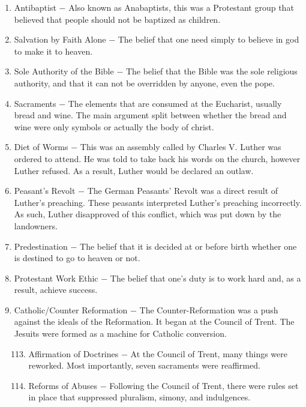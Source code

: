 \documentclass[12pt]{article}
\begin{document}
\begin{enumerate}
\item Antibaptist $-$ Also known as Anabaptists, this was a Protestant group that believed that people should not be baptized as children.

\item Salvation by Faith Alone $-$ The belief that one need simply to believe in god to make it to heaven.

\item Sole Authority of the Bible $-$ The belief that the Bible was the sole religious authority, and that it can not be overridden by anyone, even the pope.

\item Sacraments $-$ The elements that are consumed at the Eucharist, usually bread and wine. The main argument split between whether the bread and wine were only symbols or actually the body of christ.

\item Diet of Worms $-$ This was an assembly called by Charles V. Luther was ordered to attend. He was told to take back his words on the church, however Luther refused. As a result, Luther would be declared an outlaw.

\item Peasant's Revolt $-$ The German Peasants' Revolt was a direct result of Luther's preaching. These peasants interpreted Luther's preaching incorrectly. As such, Luther disapproved of this conflict, which was put down by the landowners.

\item Predestination $-$ The belief that it is decided at or before birth whether one is destined to go to heaven or not.

\item Protestant Work Ethic $-$ The belief that one's duty is to work hard and, as a result, achieve success.

\item Catholic/Counter Reformation $-$ The Counter-Reformation was a push against the ideals of the Reformation. It began at the Council of Trent. The Jesuits were formed as a machine for Catholic conversion.

\begin{enumerate}[label=\arabic{*}.]
\setcounter{enumii}{112}
\item Affirmation of Doctrines $-$ At the Council of Trent, many things were reworked. Most importantly, seven sacraments were reaffirmed.

\item Reforms of Abuses $-$ Following the Council of Trent, there were rules set in place that suppressed pluralism, simony, and indulgences.


\end{enumerate}
\end{enumerate}
\end{document}
